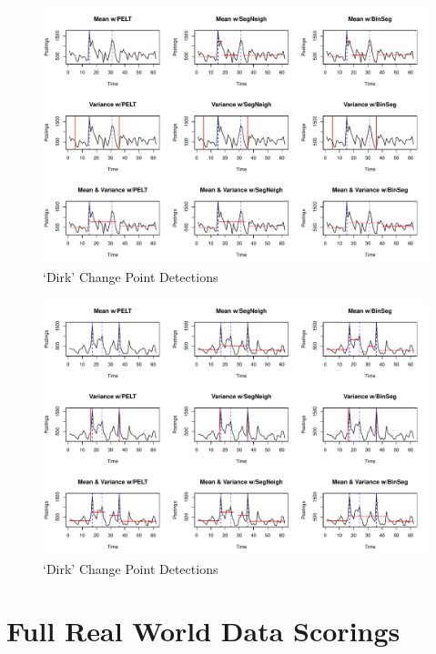 \documentclass{uvamscse}	%
\begin{document}
\begin{figure}[h]
    \includegraphics[width=\textwidth]{figures/tele2results}
    \caption{`Dirk' Change Point Detections}
    \label{fig:tele2}
\end{figure}


\begin{figure}[h]
    \includegraphics[width=\textwidth]{figures/uwvresults}
    \caption{`Dirk' Change Point Detections}
    \label{fig:uwv}
\end{figure}

\chapter{Full Real World Data Scorings}
\label{fullscores}
\end{document}
